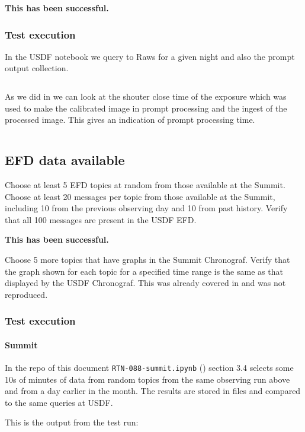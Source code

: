 \textbf{This has been successful.}
\subsubsection{Test execution}
In the USDF notebook we query to Raws for a given night and also the prompt output collection.

\begin{lstlisting}
\end{lstlisting}

As we did in  we can look at the shouter close time of the exposure which was used to make the calibrated image in prompt processing and the ingest of the processed image.
This gives an indication of prompt processing time.
\begin{lstlisting}
\end{lstlisting}


\subsection{EFD data available }
Choose at least 5 EFD topics at random from those available at the Summit.
Choose at least 20 messages per topic from those available at the Summit, including 10 from the previous observing day and 10 from past history.
Verify that all 100 messages are present in the USDF EFD.

\textbf{This has been successful.}

Choose 5 more topics that have graphs in the Summit Chronograf. Verify that the graph
shown for each topic for a specified time range is the same as that displayed by the USDF
Chronograf.
This was already covered in \cite{RTN-053} and was not reproduced.


\subsubsection{Test execution}

\paragraph{Summit} \label{sec:efdsummit}
In the repo of this document \texttt{RTN-088-summit.ipynb} ()  section 3.4
selects some 10s of minutes of data from random topics from the same observing run above and from a day earlier in the month.
The results are stored in files and compared to the same  queries at USDF.

This is the output from the test run:

